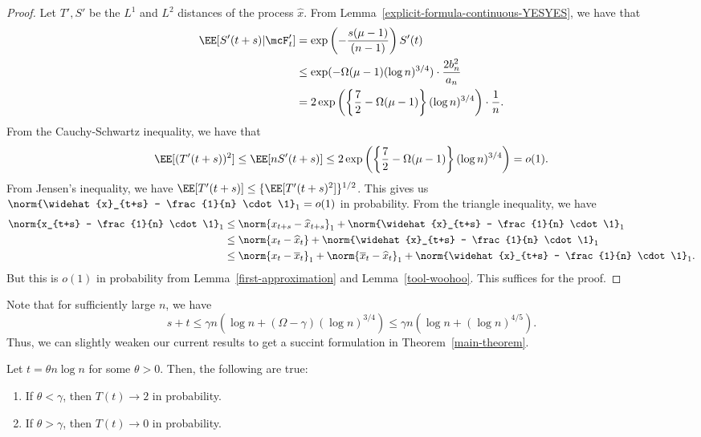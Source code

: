 \documentclass[12pt]{article}
\begin{document}
\begin{proof}
	Let $T', S'$ be the $L^1$ and $L^2$ distances of the process $\widehat{x}$. From Lemma~\ref{explicit-formula-continuous-YESYES}, we have that
	\begin{align*}
		\EE [ S'(t+s) | \mcF_t' ] & = \exp \left ( - \frac{s (\mu-1)}{(n-1)} \right ) S'(t) \\
		& \leq \exp(- \Omega (\mu-1) (\log n)^{3/4}) \cdot \frac{2b_n^2}{a_n} \\
		& = 2 \exp \left ( \left \{ \frac{7}{2} - \Omega (\mu - 1) \right \} (\log n)^{3/4} \right ) \cdot \frac{1}{n}.
	\end{align*}
	From the Cauchy-Schwartz inequality, we have that
	\[
		\EE [(T'(t+s))^2] \leq \EE [n S'(t+s)] \leq 2 \exp \left ( \left \{ \frac{7}{2} - \Omega (\mu - 1) \right \} (\log n)^{3/4} \right ) = o(1).
	\]
	From Jensen's inequality, we have $\EE[T'(t+s)] \leq \{ \EE[T'(t+s)^2] \}^{1/2}$. This gives us $\norm{\widehat{x}_{t+s} - \frac{1}{n} \cdot \1}_1 = o(1)$ in probability. From the triangle inequality, we have
	\begin{align*}
		\norm{x_{t+s} - \frac{1}{n} \cdot \1}_1 & \leq \norm{x_{t+s} - \widehat{x}_{t+s}}_1 + \norm{\widehat{x}_{t+s} - \frac{1}{n} \cdot \1}_1 \\
		& \leq \norm{x_t - \widehat{x}_t} + \norm{\widehat{x}_{t+s} - \frac{1}{n} \cdot \1}_1 \\
		& \leq \norm{x_t - \overline{x}_t}_1 + \norm{\overline{x}_t - \widehat{x}_t}_1 + \norm{\widehat{x}_{t+s} - \frac{1}{n} \cdot \1}_1. 
	\end{align*}
	But this is $o(1)$ in probability from Lemma~\ref{first-approximation} and Lemma~\ref{tool-woohoo}. This suffices for the proof. 
\end{proof}

Note that for sufficiently large $n$, we have 
\[
	s + t \leq \gamma n \left (\log n + (\Omega - \gamma) (\log n)^{3/4} \right ) \leq \gamma n ( \log n + (\log n)^{4/5}).
\]
Thus, we can slightly weaken our current results to get a succint formulation in Theorem~\ref{main-theorem}. 

\begin{thm} \label{main-theorem}
	Let $t = \theta n \log n$ for some $\theta > 0$. Then, the following are true:
	\begin{enumerate}[label = (\alph*)]
		\item If $\theta < \gamma$, then $T(t) \to 2$ in probability. 
		\item If $\theta > \gamma$, then $T(t) \to 0$ in probability. 
	\end{enumerate}
\end{thm}
\end{document}
